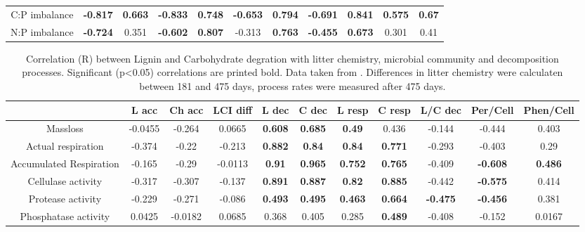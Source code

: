 \documentclass[authoryear,preprint,review,12pt]{elsarticle}
\begin{document}
\begin{table}[h!]
\begin{center}
{\begin{tabular}{ccccccccccc}
  C:P imbalance & \textbf{ -0.817 } & \textbf{ 0.663 } & \textbf{ -0.833 } & \textbf{ 0.748 } & \textbf{ -0.653 } & \textbf{ 0.794 } & \textbf{ -0.691 } & \textbf{ 0.841 } & \textbf{ 0.575 } & \textbf{ 0.67 } \\ 
  N:P imbalance & \textbf{ -0.724 } & 0.351 & \textbf{ -0.602 } & \textbf{ 0.807 } & -0.313 & \textbf{ 0.763 } & \textbf{ -0.455 } & \textbf{ 0.673 } & 0.301 & 0.41 \\ 
   \hline
\end{tabular}
}
\end{center}
\end{table}
\newpage
\begin{table}[h!]
\begin{center}
\caption{Correlation (R) between Lignin and Carbohydrate degration with litter chemistry, microbial community and decomposition processes. Significant (p<0.05) correlations are printed bold. Data taken from \cite{Mooshammer2011, Leitner2011}. Differences in litter chemistry were calculaten between 181 and 475 days, process rates were measured after 475 days.}
\label{corrtable2}
{\tiny
\begin{tabular}{ccccccccccc}
  \hline
 & L acc & Ch acc & LCI diff & L dec & C dec & L resp & C resp & L/C dec & Per/Cell & Phen/Cell \\ 
  \hline
Massloss & -0.0455 & -0.264 & 0.0665 & \textbf{ 0.608 } & \textbf{ 0.685 } & \textbf{ 0.49 } & 0.436 & -0.144 & -0.444 & 0.403 \\ 
  Actual respiration & -0.374 & -0.22 & -0.213 & \textbf{ 0.882 } & \textbf{ 0.84 } & \textbf{ 0.84 } & \textbf{ 0.771 } & -0.293 & -0.403 & 0.29 \\ 
  Accumulated Respiration & -0.165 & -0.29 & -0.0113 & \textbf{ 0.91 } & \textbf{ 0.965 } & \textbf{ 0.752 } & \textbf{ 0.765 } & -0.409 & \textbf{ -0.608 } & \textbf{ 0.486 } \\ 
  Cellulase activity & -0.317 & -0.307 & -0.137 & \textbf{ 0.891 } & \textbf{ 0.887 } & \textbf{ 0.82 } & \textbf{ 0.885 } & -0.442 & \textbf{ -0.575 } & 0.414 \\ 
  Protease activity & -0.229 & -0.271 & -0.086 & \textbf{ 0.493 } & \textbf{ 0.495 } & \textbf{ 0.463 } & \textbf{ 0.664 } & \textbf{ -0.475 } & \textbf{ -0.456 } & 0.381 \\ 
  Phosphatase activity & 0.0425 & -0.0182 & 0.0685 & 0.368 & 0.405 & 0.285 & \textbf{ 0.489 } & -0.408 & -0.152 & 0.0167 \\ 

\end{tabular}}
\end{center}
\end{table}
\end{document}
